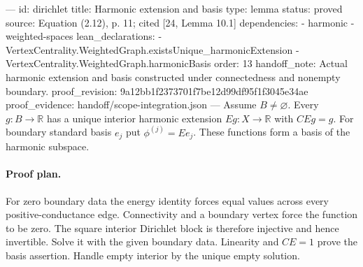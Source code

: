 ---
id: dirichlet
title: Harmonic extension and basis
type: lemma
status: proved
source: Equation (2.12), p. 11; cited [24, Lemma 10.1]
dependencies:
- harmonic
- weighted-spaces
lean_declarations:
- VertexCentrality.WeightedGraph.existsUnique_harmonicExtension
- VertexCentrality.WeightedGraph.harmonicBasis
order: 13
handoff_note: Actual harmonic extension and basis constructed under connectedness and nonempty boundary.
proof_revision: 9a12bb1f2373701f7be12d99df95f1f3045e34ae
proof_evidence: handoff/scope-integration.json
---
Assume $B\ne\varnothing$. Every $g:B\to\mathbb R$ has a unique interior harmonic extension $Eg:X\to\mathbb R$ with $CEg=g$. For boundary standard basis $e_j$ put $\phi^{(j)}=Ee_j$. These functions form a basis of the harmonic subspace.

\paragraph{Proof plan.}
For zero boundary data the energy identity forces equal values across every positive-conductance edge. Connectivity and a boundary vertex force the function to be zero. The square interior Dirichlet block is therefore injective and hence invertible. Solve it with the given boundary data. Linearity and $CE=1$ prove the basis assertion. Handle empty interior by the unique empty solution.
